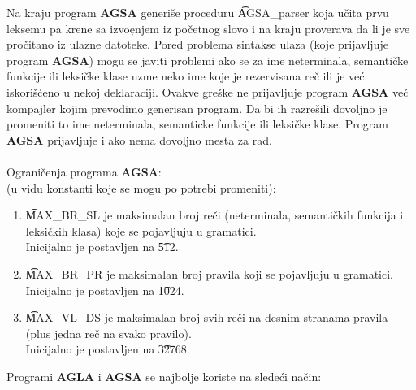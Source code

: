       Na kraju program {\bf AGSA} generi\v se proceduru \t{AGSA\_parser}
      koja u\v cita prvu leksemu pa krene sa izvo\d enjem iz po\v cetnog
      slovo i na kraju proverava da li je sve pro\v citano iz ulazne
      datoteke.
%
%
      Pored problema sintakse ulaza (koje prijavljuje program {\bf AGSA})
      mogu se javiti problemi ako se za ime neterminala, semanti\v cke
      funkcije ili leksi\v cke klase uzme neko ime koje je rezervisana
      re\v c ili je ve\'c iskori\v s\'ceno u nekoj deklaraciji.
      Ovakve gre\v ske ne prijavljuje program {\bf AGSA} ve\'c
      kompajler kojim prevodimo generisan program.
      Da bi ih razre\v sili dovoljno je promeniti to ime neterminala,
      semanticke funkcije ili leksi\v cke klase.
      Program {\bf AGSA} prijavljuje i ako nema dovoljno mesta za rad.\\
      \\
      Ograni\v cenja programa {\bf AGSA}:\\
      (u vidu konstanti koje se mogu po potrebi promeniti):
      \begin{enumerate}
        \item
        {
          \t{MAX\_BR\_SL} je maksimalan broj re\v ci (neterminala,
          semanti\v ckih funkcija i leksi\v ckih klasa) koje se
          pojavljuju u gramatici.\\
          Inicijalno je postavljen na \t{512}.
        }
        \item
        {
          \t{MAX\_BR\_PR} je maksimalan broj pravila koji se
          pojavljuju u gramatici.\\
          Inicijalno je postavljen na \t{1024}.
        }
        \item
        {
          \t{MAX\_VL\_DS} je maksimalan broj svih re\v ci na desnim
          stranama pravila (plus jedna re\v c na svako pravilo).\\
          Inicijalno je postavljen na \t{32768}.
        }
      \end{enumerate}
%
%
    Programi {\bf AGLA} i {\bf AGSA} se najbolje koriste na slede\'ci
    na\v cin:
